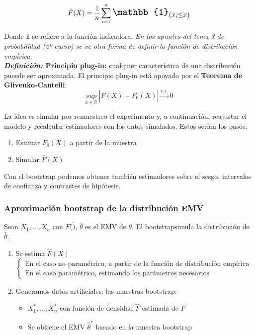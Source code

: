 $$\hat{F}(X)=\frac{1}{n}\sum_{i=1}^{n}\text{\Large{$\mathbb{1}_{(x_i\leq x)}$}}$$

\newpage

Donde $\mathbb{1}$ se refiere a la función indicadora. \textit{En los apuntes del tema 3 de probabilidad (2º curso) se ve otra forma de definir la función de distribución empírica}.\\

\textbf{\textit{Definición:} Principio plug-in:} cualquier característica de una distribución pueede ser aproximada. El principio plug-in está apoyado por el \textbf{Teorema de Glivenko-Cantelli}:
$$\underset{x\in\mathbb{R}}{sup}\ |\hat F(X)-F_0(X)|\overset{c.s.}{\longrightarrow}0$$

La idea es simular por remuestreo el experimento y, a continuación, reajustar el modelo y recalcular estimadores con los datos simulados. Estos serían los pasos:
\begin{enumerate}
    \item Estimar $F_0(X)$ a partir de la muestra
    \item Simular $\hat F(X)$
\end{enumerate}
Con el bootstrap podemos obtener también estimadores sobre el sesgo, intervalos de confianza y contrastes de hipótesis.

\subsubsection{Aproximación bootstrap de la distribución EMV}

Sean $X_1,\dots,X_n$ con $F(\dot)$, $\hat\theta$ es el EMV de $\theta$. El bootstrapsimula la distribución de $\hat\theta$.
\begin{enumerate}
    \item Se estima $\hat F(X)$$\begin{cases}
              \text{En el caso no paramétrico, a partir de la función de distribución empírica} \\
              \text{En el caso paramétrico, estimando los parámetros necesarios}
          \end{cases}$
    \item Generamos datos artificiales: las muestras bootstrap:
          \begin{itemize}
              \item $X_1^*,\dots,X_n^*$ con función de densidad $\hat F$ estimada de $F$
              \item Se obtiene el EMV $\hat\theta^*$ basado en la muestra bootstrap
          \end{itemize}
\end{enumerate}

